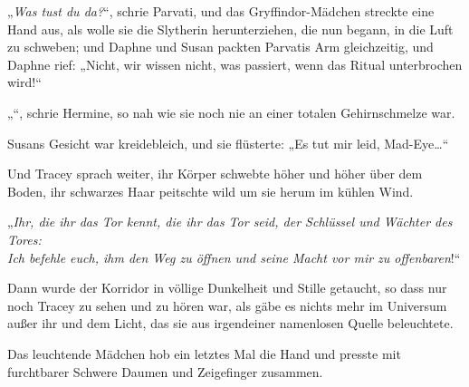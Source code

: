 „\emph{Was tust du da?}“, schrie Parvati, und das Gryffindor-Mädchen streckte eine Hand aus, als wolle sie die Slytherin herunterziehen, die nun begann, in die Luft zu schweben; und Daphne und Susan packten Parvatis Arm gleichzeitig, und Daphne rief:
„Nicht, wir wissen nicht, was passiert, wenn das Ritual unterbrochen wird!“

„“, schrie Hermine, so nah wie sie noch nie an einer totalen Gehirnschmelze war.

Susans Gesicht war kreidebleich, und sie flüsterte:
„Es tut mir leid, Mad-Eye…“

Und Tracey sprach weiter, ihr Körper schwebte höher und höher über dem Boden, ihr schwarzes Haar peitschte wild um sie herum im kühlen Wind.

„\emph{Ihr, die ihr das Tor kennt, die ihr das Tor seid, der Schlüssel und Wächter des Tores:\\
Ich befehle euch, ihm den Weg zu öffnen und seine Macht vor mir zu offenbaren}!“

Dann wurde der Korridor in völlige Dunkelheit und Stille getaucht, so dass nur noch Tracey zu sehen und zu hören war, als gäbe es nichts mehr im Universum außer ihr und dem Licht, das sie aus irgendeiner namenlosen Quelle beleuchtete.

Das leuchtende Mädchen hob ein letztes Mal die Hand und presste mit furchtbarer Schwere Daumen und Zeigefinger zusammen.

